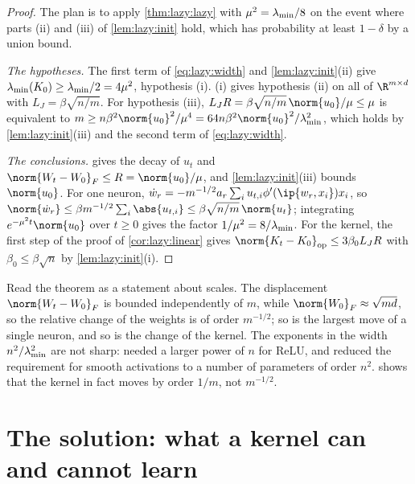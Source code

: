 \begin{refsection}
\begin{proof}
The plan is to apply \cref{thm:lazy:lazy} with $\mu^2=\lambda_{\min}/8$ on the event where parts (ii) and (iii) of \cref{lem:lazy:init} hold, which has probability at least $1-\delta$ by a union bound.

\emph{The hypotheses.} The first term of \eqref{eq:lazy:width} and \cref{lem:lazy:init}(ii) give $\lambda_{\min}(K_0)\ge\lambda_{\min}/2=4\mu^2$, hypothesis (i). (i) gives hypothesis (ii) on all of $\R^{m\times d}$ with $L_J=\beta\sqrt{n/m}$. For hypothesis (iii), $L_JR=\beta\sqrt{n/m}\,\norm{u_0}/\mu\le\mu$ is equivalent to $m\ge n\beta^2\norm{u_0}^2/\mu^4=64n\beta^2\norm{u_0}^2/\lmin^2$, which holds by \cref{lem:lazy:init}(iii) and the second term of \eqref{eq:lazy:width}.

\emph{The conclusions.}  gives the decay of $u_t$ and $\norm{W_t-W_0}_F\le R=\norm{u_0}/\mu$, and \cref{lem:lazy:init}(iii) bounds $\norm{u_0}$. For one neuron, $\dot w_r=-m^{-1/2}a_r\sum_iu_{t,i}\phi'(\ip{w_r,x_i})x_i$, so $\norm{\dot w_r}\le\beta m^{-1/2}\sum_i\abs{u_{t,i}}\le\beta\sqrt{n/m}\,\norm{u_t}$; integrating $e^{-\mu^2t}\norm{u_0}$ over $t\ge0$ gives the factor $1/\mu^2=8/\lambda_{\min}$. For the kernel, the first step of the proof of \cref{cor:lazy:linear} gives $\norm{K_t-K_0}_{\op}\le3\beta_0L_JR$ with $\beta_0\le\beta\sqrt n$ by \cref{lem:lazy:init}(i).
\end{proof}

Read the theorem as a statement about scales. The displacement $\norm{W_t-W_0}_F$ is bounded independently of $m$, while $\norm{W_0}_F\approx\sqrt{md}$, so the relative change of the weights is of order $m^{-1/2}$; so is the largest move of a single neuron, and so is the change of the kernel. The exponents in the width $n^2/\lambda_{\min}^2$ are not sharp: \textcite{DuEtAl2019} needed a larger power of $n$ for ReLU, and \textcite{OymakSoltanolkotabi2020} reduced the requirement for smooth activations to a number of parameters of order $n^2$.  shows that the kernel in fact moves by order $1/m$, not $m^{-1/2}$.

\section{The solution: what a kernel can and cannot learn}\label{sec:lazy:kernels}


\end{refsection}
